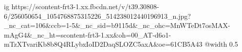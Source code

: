  
 
 
 
 

\ifcmt
  ig https://scontent-frt3-1.xx.fbcdn.net/v/t39.30808-6/256050654_1054768875315226_514238012440196913_n.jpg?_nc_cat=106&ccb=1-5&_nc_sid=b9115d&_nc_ohc=MnWTeDt7osMAX-mAgG4&_nc_ht=scontent-frt3-1.xx&oh=00_AT-d6o1-mTzXTvariKb8b8Q4RLybxIoID2DaqSLOZC5axA&oe=61CB5A43
  @width 0.5
\fi
